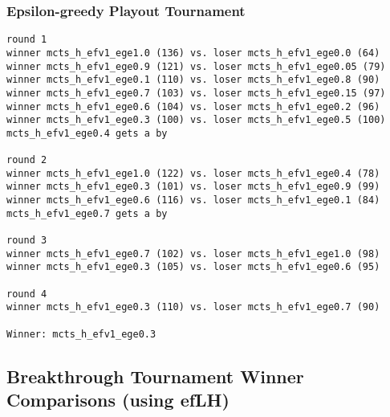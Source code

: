 \documentclass{article}
\begin{document}
\subsubsection{Epsilon-greedy Playout Tournament}

\begin{verbatim}
round 1
winner mcts_h_efv1_ege1.0 (136) vs. loser mcts_h_efv1_ege0.0 (64)
winner mcts_h_efv1_ege0.9 (121) vs. loser mcts_h_efv1_ege0.05 (79)
winner mcts_h_efv1_ege0.1 (110) vs. loser mcts_h_efv1_ege0.8 (90)
winner mcts_h_efv1_ege0.7 (103) vs. loser mcts_h_efv1_ege0.15 (97)
winner mcts_h_efv1_ege0.6 (104) vs. loser mcts_h_efv1_ege0.2 (96)
winner mcts_h_efv1_ege0.3 (100) vs. loser mcts_h_efv1_ege0.5 (100)
mcts_h_efv1_ege0.4 gets a by

round 2
winner mcts_h_efv1_ege1.0 (122) vs. loser mcts_h_efv1_ege0.4 (78)
winner mcts_h_efv1_ege0.3 (101) vs. loser mcts_h_efv1_ege0.9 (99)
winner mcts_h_efv1_ege0.6 (116) vs. loser mcts_h_efv1_ege0.1 (84)
mcts_h_efv1_ege0.7 gets a by

round 3
winner mcts_h_efv1_ege0.7 (102) vs. loser mcts_h_efv1_ege1.0 (98)
winner mcts_h_efv1_ege0.3 (105) vs. loser mcts_h_efv1_ege0.6 (95)

round 4
winner mcts_h_efv1_ege0.3 (110) vs. loser mcts_h_efv1_ege0.7 (90)

Winner: mcts_h_efv1_ege0.3
\end{verbatim}

\subsection{Breakthrough Tournament Winner Comparisons (using efLH)}

\end{document}
